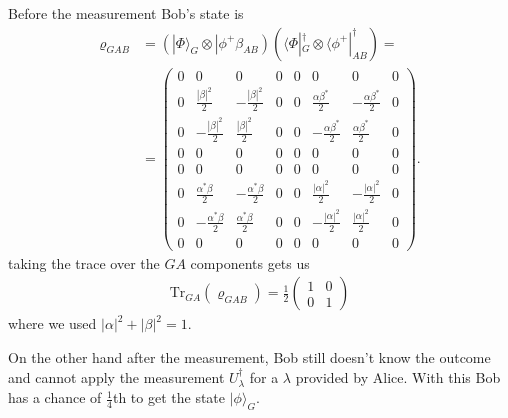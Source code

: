 \documentclass[a4paper]{article}
\begin{document}
Before the measurement Bob's state is
\begin{align}
    \varrho_{GAB} &=
    (|\Phi\rangle_G \otimes |\phi^+\beta_{AB})(\langle\Phi|_G^\dagger\otimes
    \langle\phi^+|_{AB}^\dagger)=\\
    &=
\begin{pmatrix}0 & 0 & 0 & 0 & 0 & 0 & 0 & 0\\0 & \frac{|\beta|^{2}}{2} & -
    \frac{|\beta|^{2}}{2} & 0 & 0 & \frac{\alpha\beta^*}{2} & -
    \frac{\alpha\beta^*}{2} & 0\\0 & -
\frac{|\beta|^{2}}{2} & \frac{|\beta|^{2}}{2} & 0 & 0 & - \frac{\alpha
    \beta^*}{2} & \frac{\alpha \beta^*}{2} &
0\\0 & 0 & 0 & 0 & 0 & 0 & 0 & 0\\0 & 0 & 0 & 0 & 0 & 0 & 0 & 0\\0 &
    \frac{\alpha^*
\beta}{2} & - \frac{\alpha^* \beta}{2} & 0 & 0 & \frac{|\alpha|^{2}}{2} & -
    \frac{|\alpha|^{2}}{2} & 0\\0 &
- \frac{\alpha^* \beta}{2} & \frac{\alpha^* \beta}{2} & 0 & 0 & -
    \frac{|\alpha|^{2}}{2} & \frac{|\alpha|^{2}}{2} &
0\\0 & 0 & 0 & 0 & 0 & 0 & 0 & 0\end{pmatrix}.
\end{align}
taking the trace over the $GA$ components gets us
\begin{align}
    \text{Tr}_{GA}(\varrho_{GAB}) = \frac{1}{2}
    \begin{pmatrix}
        1 & 0 \\
        0 & 1
    \end{pmatrix}
\end{align}
where we used $|\alpha|^2 + |\beta|^2 = 1$.

On the other hand after the measurement, Bob still doesn't know the outcome
and cannot apply the measurement $U_\lambda^\dagger$ for a
$\lambda$ provided by Alice. With this Bob has a chance of $\frac{1}{4}$th to
get the state $|\phi\rangle_G$.
\end{document}
